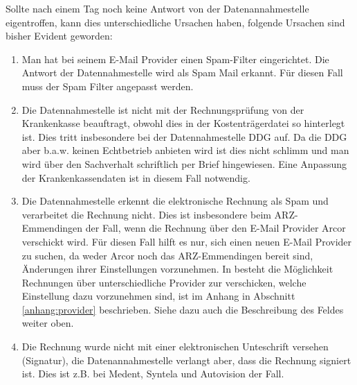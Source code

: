 Sollte nach einem Tag noch keine Antwort von der Datenannahmestelle 
eigentroffen, kann dies unterschiedliche Ursachen haben, folgende Ursachen
sind bisher Evident geworden:
\begin{enumerate}
\item 
{}
Man hat bei seinem E-Mail Provider einen Spam-Filter eingerichtet.
Die Antwort der Datennahmestelle wird als Spam Mail erkannt.
Für diesen Fall muss der Spam Filter angepasst werden.
\item
{}
Die Datennahmestelle ist nicht mit der Rechnungsprüfung von der
Krankenkasse beauftragt, obwohl dies in der Kostenträgerdatei so hinterlegt
ist. Dies tritt insbesondere bei der Datennahmestelle DDG auf. Da die DDG
aber b.a.w. keinen Echtbetrieb anbieten wird ist dies nicht schlimm und
man  wird über den Sachverhalt schriftlich per Brief hingewiesen.
Eine Anpassung der Krankenkassendaten ist in diesem Fall notwendig.
\item 
Die Datennahmestelle erkennt die elektronische Rechnung als Spam und
verarbeitet die Rechnung nicht. Dies ist insbesondere beim ARZ-Emmendingen
der Fall, wenn die Rechnung über den E-Mail Provider Arcor verschickt wird.
Für diesen Fall hilft es nur, sich einen neuen E-Mail Provider zu suchen,
da weder Arcor noch das ARZ-Emmendingen bereit sind, Änderungen ihrer
Einstellungen vorzunehmen.
In \tinyHeb\/ besteht die Möglichkeit Rechnungen über unterschiedliche
Provider zur verschicken, welche Einstellung dazu vorzunehmen sind, ist
im Anhang in Abschnitt \vref{anhang:provider} beschrieben. Siehe dazu
auch die Beschreibung des Feldes  weiter oben.
\item
{}
Die Rechnung wurde nicht mit einer elektronischen Unteschrift versehen
(Signatur), die Datenannahmestelle verlangt aber, dass die Rechnung
signiert ist. Dies ist z.B. bei Medent, Syntela und Autovision der Fall.
\end{enumerate}

